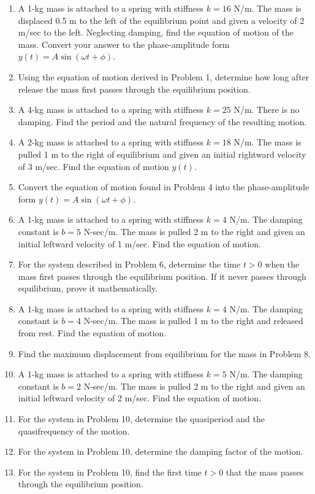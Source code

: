 \documentclass[11pt]{article}
\begin{document}
\begin{enumerate}[label=\textbf{\arabic*.}]
    \item A 1-kg mass is attached to a spring with stiffness $k = 16$ N/m. The mass is displaced 0.5 m to the left of the equilibrium point and given a velocity of 2 m/sec to the left. Neglecting damping, find the equation of motion of the mass. Convert your answer to the phase-amplitude form $y(t) = A\sin(\omega t + \phi)$.
    \item Using the equation of motion derived in Problem 1, determine how long after release the mass first passes through the equilibrium position.
    \item A 4-kg mass is attached to a spring with stiffness $k = 25$ N/m. There is no damping. Find the period and the natural frequency of the resulting motion.
    \item A 2-kg mass is attached to a spring with stiffness $k = 18$ N/m. The mass is pulled 1 m to the right of equilibrium and given an initial rightward velocity of 3 m/sec. Find the equation of motion $y(t)$.
    \item Convert the equation of motion found in Problem 4 into the phase-amplitude form $y(t) = A\sin(\omega t + \phi)$.
    
    \item A 1-kg mass is attached to a spring with stiffness $k = 4$ N/m. The damping constant is $b = 5$ N-sec/m. The mass is pulled 2 m to the right and given an initial leftward velocity of 1 m/sec. Find the equation of motion.
    \item For the system described in Problem 6, determine the time $t > 0$ when the mass first passes through the equilibrium position. If it never passes through equilibrium, prove it mathematically.
    
    \item A 1-kg mass is attached to a spring with stiffness $k = 4$ N/m. The damping constant is $b = 4$ N-sec/m. The mass is pulled 1 m to the right and released from rest. Find the equation of motion.
    \item Find the maximum displacement from equilibrium for the mass in Problem 8.
    
    \item A 1-kg mass is attached to a spring with stiffness $k = 5$ N/m. The damping constant is $b = 2$ N-sec/m. The mass is pulled 2 m to the right and given an initial leftward velocity of 2 m/sec. Find the equation of motion.
    \item For the system in Problem 10, determine the quasiperiod and the quasifrequency of the motion.
    \item For the system in Problem 10, determine the damping factor of the motion.
    \item For the system in Problem 10, find the first time $t > 0$ that the mass passes through the equilibrium position.
    

\end{enumerate}
\end{document}
